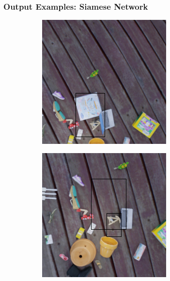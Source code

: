 \documentclass[13.5pt,aspecratio=169, xcolor=dvipsnames]{beamer}
\begin{document}
\begin{frame}
    \onehalfspacing
        \frametitle{Output Examples: Siamese Network}    
        \begin{figure}
            \begin{subfigure}{0.5\textwidth}
              \centering
              \includegraphics[width=\linewidth]{Example/Output/SM_2.png}
              \captionsetup{labelformat=empty}
            \end{subfigure}%
            \begin{subfigure}{0.5\textwidth}
              \centering
              \includegraphics[width=\linewidth]{Example/Output/SM_2_2.png}
              \captionsetup{labelformat=empty}
            \end{subfigure}
            \captionsetup{labelformat=empty}
        \end{figure}


\end{frame}
\end{document}
